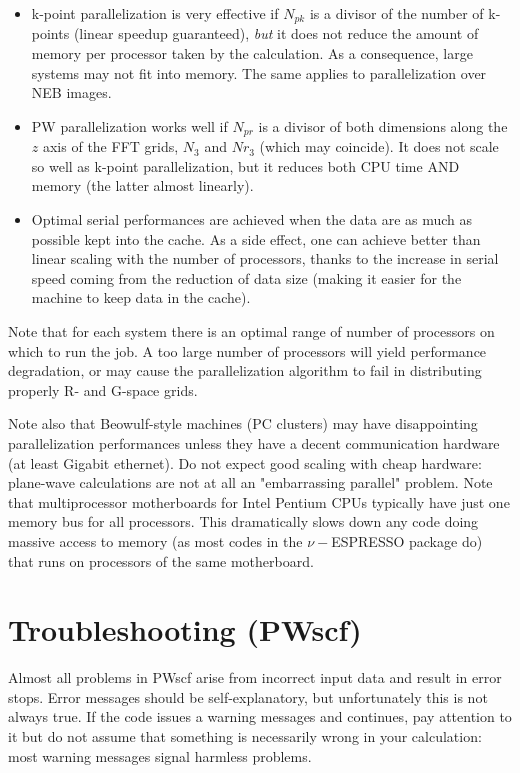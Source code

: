 \documentclass[12pt,a4paper]{article}
\begin{document}
\begin{itemize}
  \item
    k-point parallelization is very effective if $N_{pk}$ is a divisor
    of the number of k-points (linear speedup guaranteed), \emph{but}
    it does not reduce the amount of memory per processor taken by the
    calculation.
    As a consequence, large systems may not fit into memory.
    The same applies to parallelization over NEB images.
  \item
    PW parallelization works well if $N_{pr}$ is a divisor of both
    dimensions along the $z$ axis of the FFT grids, $N_3$ and $Nr_3$
    (which may coincide).
    It does not scale so well as k-point parallelization, but it
    reduces both CPU time AND memory (the latter almost linearly).
  \item
    Optimal serial performances are achieved when the data are as much
    as possible kept into the cache.
    As a side effect, one can achieve better than linear scaling with
    the number of processors, thanks to the increase in serial speed
    coming from the reduction of data size (making it easier for the
    machine to keep data in the cache).  
\end{itemize}

Note that for each system there is an optimal range of number of 
processors on which to run the job.
A too large number of processors will yield performance degradation,
or may cause the parallelization algorithm to fail in distributing
properly R- and G-space grids.

Note also that Beowulf-style machines (PC clusters) may have
disappointing parallelization performances unless they have a decent
communication hardware (at least Gigabit ethernet).
Do not expect good scaling with cheap hardware: plane-wave
calculations are not at all an "embarrassing parallel" problem. 
Note that multiprocessor motherboards for Intel Pentium CPUs typically
have just one memory bus for all processors.
This dramatically slows down any code doing massive access to memory
(as most codes in the $\nu-$ESPRESSO package do) that runs on processors of
the same motherboard.

\clearpage

\section{Troubleshooting (PWscf)}

Almost all problems in PWscf arise from incorrect input data and
result in error stops. Error messages should be self-explanatory, 
but unfortunately this is not always true. If the code issues a
warning messages and continues, pay attention to it but do not
assume that something is necessarily wrong in your calculation:
most warning messages signal harmless problems.
\end{document}
